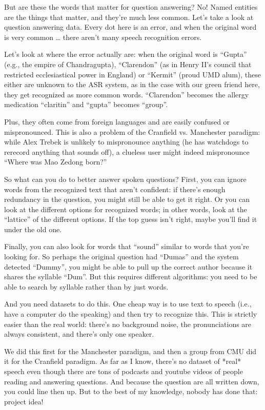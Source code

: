 But are these the words that matter for question answering?  No!  Named entities are the things that matter, and they’re much less common.  Let’s take a look at question answering data.  Every dot here is an error, and when the original word is very common … there aren’t many speech recognition errors.

Let’s look at where the error actually are: when the original word is “Gupta” (e.g., the empire of Chandragupta), “Clarendon” (as in Henry II’s council that restricted ecclesiastical power in England) or “Kermit” (proud UMD alum), these either are unknown to the ASR system, as in the case with our green friend here, they get recognized as more common words.  “Clarendon” becomes the allergy medication “claritin” and “gupta” becomes “group”.  

Plus, they often come from foreign languages and are easily confused or mispronounced.  This is also a problem of the Cranfield vs. Manchester paradigm: while Alex Trebek is unlikely to mispronounce anything (he has watchdogs to rerecord anything that sounds off), a clueless user might indeed mispronounce “Where was Mao Zedong born?”

So what can you do to better answer spoken questions?  First, you can ignore words from the recognized text that aren’t confident: if there’s enough redundancy in the question, you might still be able to get it right.  Or you can look at the different options for recognized words; in other words, look at the “lattice” of the different options.  If the top guess isn’t right, maybe you’ll find it under the old one.

Finally, you can also look for words that “sound” similar to words that you’re looking for.  So perhaps the original question had “Dumas” and the system detected “Dummy”, you might be able to pull up the correct author because it shares the syllable “Dum”.  But this requires different algorithms: you need to be able to search by syllable rather than by just words.

And you need datasets to do this.  One cheap way is to use text to speech (i.e., have a computer do the speaking) and then try to recognize this.  This is strictly easier than the real world: there’s no background noise, the pronunciations are always consistent, and there’s only one speaker.

We did this first for the Manchester paradigm, and then a group from CMU did it for the Cranfield paradigm.  As far as I know, there’s no dataset of *real* speech even though there are tons of podcasts and youtube videos of people reading and answering questions.  And because the question are all written down, you could line then up.  But to the best of my knowledge, nobody has done that: project idea!

